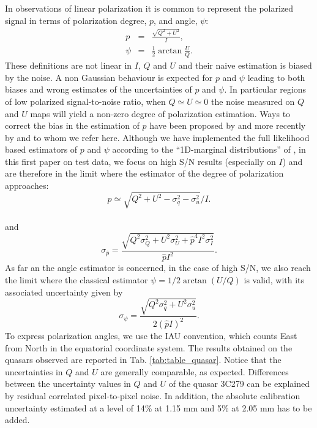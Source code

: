 \documentclass[twocolumn, traditabstract]{aa}
\begin{document}
In observations of linear polarization it is common to represent the polarized signal in terms of polarization
degree, $p$, and angle, $\psi$:
\begin{eqnarray}
 p    &=& \frac{\sqrt{Q^2 + U^2}}{I},\label{p_degree}\\
 \psi &=& \frac{1}{2}\arctan\frac{U}{Q}.\label{angle_polar}
 \end{eqnarray}
 These definitions are not linear in $I$, $Q$ and $U$ and their naive estimation
 is biased by the noise. A non Gaussian behaviour is expected for $p$ and $\psi$
 leading to both biases and wrong estimates of the uncertainties of $p$ and
 $\psi$.  In particular regions of low polarized signal-to-noise ratio, when $Q
 \simeq U \simeq 0$ the noise measured on $Q$ and $U$ maps will yield a non-zero
 degree of polarization estimation.  Ways to correct the bias in the estimation
 of $p$ have been proposed by \cite{1980A&A....91...97S} and more recently by
 \cite{1985A&A...142..100S} and \citep{montier} to whom we refer
 here.
Although we have implemented the full
   likelihood based estimators of $p$ and $\psi$ according to the ``1D-marginal
   distributions'' of \citet{montier}, in this first paper on test data, we
   focus on high S/N results (especially on $I$) and are therefore in the limit
   where the estimator of the degree of polarization approaches:
   \begin{equation}
   \hat{p} \simeq \sqrt{Q^2 + U^2 - \sigma_q^2 - \sigma_u^2}/I.
   \end{equation}
   \\
and
   \begin{equation}\label{p_c_uncertainty}
   \sigma_{\hat{p}} = \frac{\sqrt{Q^2\sigma_Q^2 + U^2\sigma_U^2 + \hat{p}^4I^2\sigma_I^2}}{\hat{p}I^2}.
   \end{equation} 
As far an the angle estimator is concerned, in the case of high S/N, we
  also reach the limit where the classical estimator $\psi=1/2\arctan(U/Q)$ is
  valid, with its associated uncertainty given by
  \begin{equation}\label{angle_uncertainty}
    \sigma_{\psi} = \frac{\sqrt{Q^2\sigma_q^2 + U^2\sigma_u^2}}{2(\hat{p}I)^2}.
    \end{equation}
To express polarization angles, we use the IAU convention, which counts East from North in the equatorial coordinate system. The results obtained on the quasars observed are reported in Tab. \ref{tab:table_quasar}. Notice that the uncertainties in $Q$ and $U$ are generally comparable, as expected. 
Differences between the uncertainty values in $Q$ and $U$ of the quasar 3C279 can be explained by residual correlated pixel-to-pixel noise. In addition, the absolute calibration uncertainty estimated at a level of 14\% at 1.15 mm and 5\% at 2.05 mm has to be added.
\end{document}
